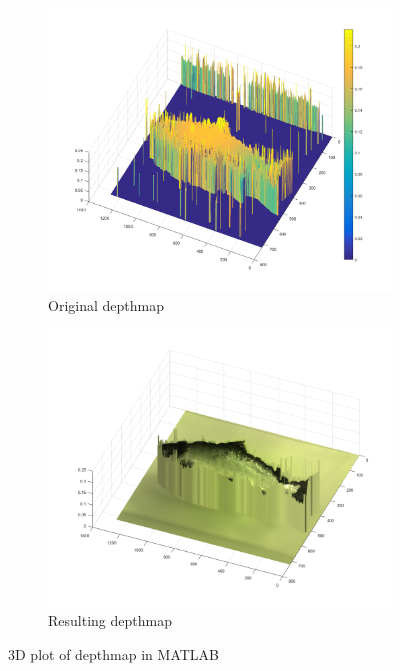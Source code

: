 \begin{figure}[H]
    \centering
    \begin{subfigure}{1\textwidth}
        \centering
        \includegraphics[width=.8\linewidth]{images/3D_results/original_3D_87}
        \caption{Original depthmap} 
        \label{fig:3D_original_87}
    \end{subfigure}\hspace*{\fill}
    
    \medskip
    \begin{subfigure}{1\textwidth}
        \centering
        \includegraphics[width=.8\linewidth]{images/3D_results/fixed_3D_87}
        \caption{Resulting depthmap} 
        \label{fig:3D_fixed_87}
    \end{subfigure}\hspace*{\fill}
    \caption{3D plot of depthmap in MATLAB}
    \label{fig:3D_plot_87}
\end{figure}



